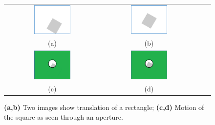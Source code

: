 \documentclass[11pt]{article}
\begin{document}
\begin{itemize}
\begin{figure}[!hbt]
\centering
\begin{tabular}{cc  cc}
  \includegraphics[width=0.4\textwidth]{../ap3.png} &
  \includegraphics[width=0.4\textwidth]{../ap4.png} \\
  (a) & (b) \\
  \includegraphics[width=0.4\textwidth]{../ap1.png} &
  \includegraphics[width=0.4\textwidth]{../ap2.png} \\
  (c) & (d)
 \end{tabular}
 \vspace{-10pt}
 \caption{{\bf (a,b)} Two images show translation of a rectangle;  {\bf (c,d)} Motion of the square as seen through an aperture.}
 \label{fig6}
\end{figure}
\end{itemize}
\end{document}
